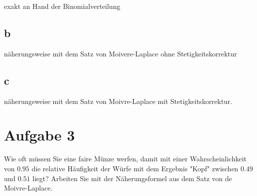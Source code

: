 exakt an Hand der Binomialverteilung

\subsection{b}

näherungsweise mit dem Satz von Moivere-Laplace ohne Stetigkeitskorrektur

\subsection{c}

näherungsweise mit dem Satz von Moivre-Laplace mit Stetigkeitskorrektur.

\section{Aufgabe 3}

Wie oft müssen Sie eine faire Münze werfen, damit mit einer Wahrscheinlichkeit von $0.95$ die relative Häufigkeit der Würfe mit dem Ergebnis "Kopf" zwischen $0.49$ und $0.51$ liegt? Arbeiten Sie mit der Näherungsformel aus dem Satz von de Moivre-Laplace.

